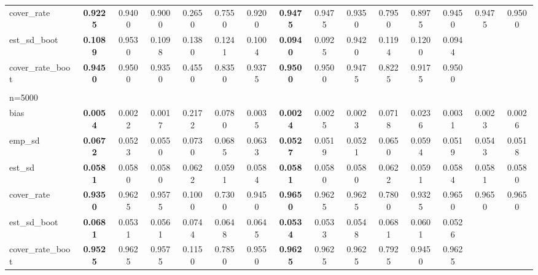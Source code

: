 \documentclass[11pt]{article}
\numberwithin{equation}{section}
\begin{document}
\begin{table}[]
{\begin{tabular}{lcccccccccccccc}
			cover\_rate & \textbf{0.9225} & 0.9400 & 0.9000 & 0.2650 & 0.7550 & 0.9200 & \textbf{0.9475} & 0.9475 & 0.9350 & 0.7950 & 0.8975 & 0.9450 & 0.9475 & 0.9500 \\
			est\_sd\_boot & \textbf{0.1089} & 0.9530 & 0.1098 & 0.1380 & 0.1241 & 0.1004 & \textbf{0.0940} & 0.0925 & 0.9420 & 0.1194 & 0.1200 & 0.0944 &  &  \\
			cover\_rate\_boot & \textbf{0.9450} & 0.9500 & 0.9350 & 0.4550 & 0.8350 & 0.9375 & \textbf{0.9500} & 0.9500 & 0.9475 & 0.8225 & 0.9175 & 0.9500 &  &  \\
			\\
			n=5000 &  &  &  &  &  &  &  &  &  &  &  &  &  &  \\
			\hline
			bias & \textbf{0.0054} & 0.0022 & 0.0017 & 0.2172 & 0.0780 & 0.0035 & \textbf{0.0024} & 0.0025 & 0.0023 & 0.0718 & 0.0236 & 0.0031 & 0.0023 & 0.0026 \\
			emp\_sd & \textbf{0.0672} & 0.0523 & 0.0550 & 0.0730 & 0.0685 & 0.0633 & \textbf{0.0527} & 0.0519 & 0.0521 & 0.0650 & 0.0594 & 0.0519 & 0.0543 & 0.0518 \\
			est\_sd & \textbf{0.0581} & 0.0580 & 0.0580 & 0.0622 & 0.0591 & 0.0584 & \textbf{0.0581} & 0.0580 & 0.0580 & 0.0622 & 0.0591 & 0.0584 & 0.0581 & 0.0580 \\
			cover\_rate & \textbf{0.9350} & 0.9625 & 0.9575 & 0.1000 & 0.7300 & 0.9450 & \textbf{0.9650} & 0.9625 & 0.9625 & 0.7800 & 0.9325 & 0.9650 & 0.9650 & 0.9650 \\
			est\_sd\_boot & \textbf{0.0681} & 0.0531 & 0.0561 & 0.0744 & 0.0648 & 0.0645 & \textbf{0.0534} & 0.0533 & 0.0548 & 0.0681 & 0.0601 & 0.0526 &  &  \\
			cover\_rate\_boot & \textbf{0.9525} & 0.9625 & 0.9575 & 0.1150 & 0.7850 & 0.9550 & \textbf{0.9625} & 0.9625 & 0.9625 & 0.7925 & 0.9450 & 0.9625 &  & \\
			\hline
		\end{tabular}
		\label{tab:simu_average_ate_p10_2}
	}
	
\end{table}
\end{document}
